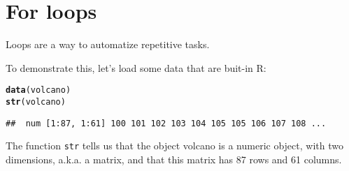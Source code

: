 \documentclass[12pt,a4paper]{scrartcl}\usepackage[]{graphicx}\usepackage[]{color}
\makeatletter
\newcommand{\hlstd}[1]{\textcolor[rgb]{0.345,0.345,0.345}{#1}}%
\newcommand{\hlkwd}[1]{\textcolor[rgb]{0.737,0.353,0.396}{\textbf{#1}}}%
\newenvironment{kframe}{%
 \def\at@end@of@kframe{}%
 \ifinner\ifhmode%
  \def\at@end@of@kframe{\end{minipage}}%
  \begin{minipage}{\columnwidth}%
 \fi\fi%
 \def\FrameCommand##1{\hskip\@totalleftmargin \hskip-\fboxsep
 \colorbox{shadecolor}{##1}\hskip-\fboxsep
     \hskip-\linewidth \hskip-\@totalleftmargin \hskip\columnwidth}%
 \MakeFramed {\advance\hsize-\width
   \@totalleftmargin\z@ \linewidth\hsize
   \@setminipage}}%
 {\par\unskip\endMakeFramed%
 \at@end@of@kframe}
\newenvironment{knitrout}{}{} %
\makeatother
\begin{document}
\section{For loops}
Loops are a way to automatize repetitive tasks. 

To demonstrate this, let's load some data that are buit-in R:
\begin{knitrout}
\color{fgcolor}\begin{kframe}
\begin{alltt}
\hlkwd{data}\hlstd{(volcano)}
\hlkwd{str}\hlstd{(volcano)}
\end{alltt}
\begin{verbatim}
##  num [1:87, 1:61] 100 101 102 103 104 105 105 106 107 108 ...
\end{verbatim}
\end{kframe}
\end{knitrout}
The function \texttt{str} tells us that the object volcano is a numeric object, with two dimensions, a.k.a. a matrix, and that this matrix has 87 rows and 61 columns.
\end{document}
